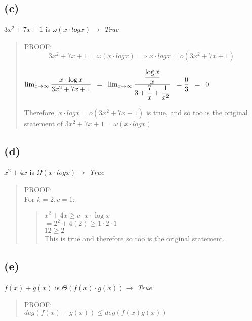 \documentclass[12pt]{article}%
\begin{document}
\subsection*{(c)}
$3x^2 +7x + 1$ is $\omega(x\cdot logx) \xrightarrow{}$ \textit{True} \\
\bigskip
\begin{quote}
PROOF:\\
$$3x^2 +7x + 1 = \omega(x\cdot logx) \implies x\cdot logx = o(3x^2 +7x + 1)$$
\begin{center}
    $\lim_{x \to \infty} \dfrac{x\cdot \log x}{3x^2 + 7x +1} \hspace{5px}  =\hspace{5px}\lim_{x \to \infty} \dfrac{\dfrac{\log x}{x}}{3 + \dfrac{7}{x} + \dfrac{1}{x^2}}\hspace{5px} = \dfrac{0}{3} \hspace{5px}=\hspace{5px} 0$
\end{center}
Therefore, $x\cdot logx = o(3x^2 +7x + 1)$ is true, and so too is the original statement of $3x^2 +7x + 1 = \omega(x\cdot logx) $
\end{quote}
\subsection*{(d)}
$x^2 +4x$ is $\Omega(x \cdot logx) \xrightarrow{}$ \textit{True} \\
\bigskip
\begin{quote}
PROOF:\\


\skip
For $k=2,c=1$:\\
\begin{quote}
$x^2 + 4x \geq c \cdot x \cdot \log x$\\
$= 2^2 + 4(2) \geq 1 \cdot 2 \cdot 1$\\
$12 \geq 2$\\
This is true and therefore so too is the original statement.
\end{quote}
\end{quote}
\subsection*{(e)}
$f(x) + g(x)$ is $\Theta (f(x)\cdot g(x)) \xrightarrow{}$ \textit{True} \\
\bigskip
\begin{quote}
PROOF:\\
    $deg(f(x)+g(x)) \leq deg(f(x)g(x))$\\


\end{quote}
\end{document}
